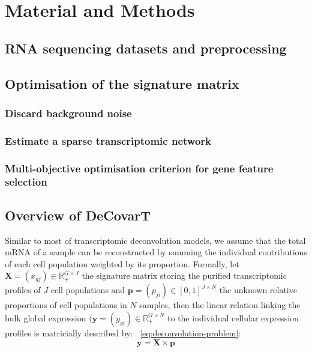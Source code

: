 \documentclass[long, final]{jobim}
\begin{document}
\section{Material and Methods}
\label{sec:methods}

\subsection{RNA sequencing datasets and preprocessing}
\label{subsec:preprocessing}

\subsection{Optimisation of the signature matrix}
\label{subsec:signature-matrix}

\subsubsection{Discard background noise}
\label{subsubsec:background-noise}

\subsubsection{Estimate a sparse transcriptomic network}
\label{subsubsec:gLasso}

\subsubsection{Multi-objective optimisation criterion for gene feature selection}
\label{subsubsec:genetic-algorithm}

\subsection{Overview of DeCovarT}
\label{subsec:DeCovarT}

Similar to most of transcriptomic deconvolution models, we assume that the total mRNA of a sample can be reconstructed by summing the individual contributions of each cell population weighted by its proportion. Formally, let \(\boldsymbol{X}=(x_{gj}) \in \mathbb{R}_+^{G\times J}\) the signature matrix storing the purified transcriptomic profiles of $J$ cell populations and \(\boldsymbol{p}=(p_{ji})\in [0, 1]^{J \times N}\) the unknown relative proportions of cell populations in $N$ samples, then the linear relation linking the bulk global expression $(\boldsymbol{y}=(y_{gi}) \in \mathbb{R}_+^{G\times N}$ to the individual cellular expression profiles is matricially described by: \equationname~\ref{eq:deconvolution-problem}: 
\begin{equation}
\label{eq:deconvolution-problem}
\boldsymbol{y}=\boldsymbol{X} \times \boldsymbol{p}
\end{equation} 
\end{document}
